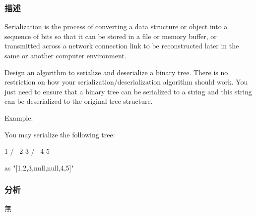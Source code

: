 \subsubsection{描述}
Serialization is the process of converting a data structure or object into a sequence of bits so that it can be stored in a file or memory buffer, or transmitted across a network connection link to be reconstructed later in the same or another computer environment.

Design an algorithm to serialize and deserialize a binary tree. There is no restriction on how your serialization/deserialization algorithm should work. You just need to ensure that a binary tree can be serialized to a string and this string can be deserialized to the original tree structure.

Example:
\begin{Code}
You may serialize the following tree:

    1
   / \
  2   3
     / \
    4   5

as "[1,2,3,null,null,4,5]"
\end{Code}

\subsubsection{分析}
無


